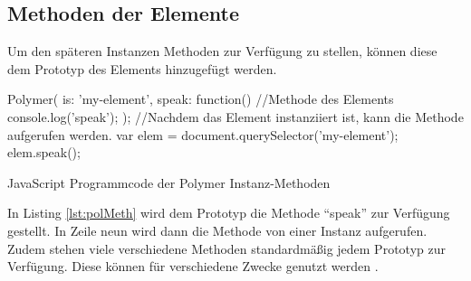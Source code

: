 \documentclass[12pt, paper=a4, bibtotoc, toc=listof, headsepline=true, numbers=endperiod]{scrreprt}
\begin{document}
\subsection{Methoden der Elemente}
Um den späteren Instanzen Methoden zur Verfügung zu stellen, können diese dem Prototyp des Elements hinzugefügt werden.
\begin{listing}[H]
	\begin{JavaScriptcode*}{}
Polymer({
   is: 'my-element',
   speak: function(){  //Methode des Elements
	   console.log('speak');
   }
});
//Nachdem das Element instanziiert ist, kann die Methode aufgerufen werden.
var elem = document.querySelector('my-element');
elem.speak();
	\end{JavaScriptcode*}
	\caption[Polymer Instanz-Methoden]{JavaScript Programmcode der Polymer Instanz-Methoden}
	\label{lst:polMeth}
\end{listing}\noindent
In Listing \ref{lst:polMeth} wird dem Prototyp die Methode \enquote{speak} zur Verfügung gestellt. In Zeile neun wird dann die Methode von einer Instanz aufgerufen. Zudem stehen viele verschiedene Methoden standardmäßig jedem Prototyp zur Verfügung. Diese können für verschiedene Zwecke genutzt werden \cite{polyInstMeth}.
\end{document}
